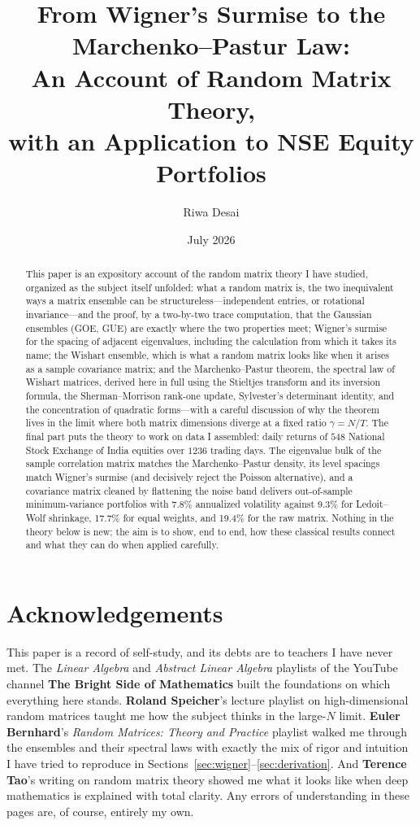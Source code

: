 \documentclass[11pt]{article}
\title{From Wigner's Surmise to the Marchenko--Pastur Law:\\
An Account of Random Matrix Theory,\\
with an Application to NSE Equity Portfolios}
\author{Riwa Desai}
\date{July 2026}
\begin{document}
\maketitle

\begin{abstract}
This paper is an expository account of the random matrix theory I have
studied, organized as the subject itself unfolded: what a random matrix is, the two inequivalent ways a matrix ensemble can
be structureless---independent entries, or rotational invariance---and the
proof, by a two-by-two trace computation, that the Gaussian ensembles (GOE,
GUE) are exactly where the two properties meet; Wigner's surmise for the
spacing of adjacent eigenvalues, including the calculation from which it
takes its name; the Wishart ensemble, which is what a random matrix looks
like when it arises as a sample covariance matrix; and the
Marchenko--Pastur theorem, the spectral law of Wishart matrices, derived
here in full using the Stieltjes transform and its
inversion formula, the Sherman--Morrison rank-one update, Sylvester's
determinant identity, and the concentration of quadratic forms---with a
careful discussion of why the theorem lives in the limit where both matrix
dimensions diverge at a fixed ratio $\gamma=N/T$. The final part puts the
theory to work on data I assembled: daily returns of $548$ National Stock
Exchange of India equities over $1236$ trading days. The eigenvalue bulk of
the sample correlation matrix matches the Marchenko--Pastur density, its
level spacings match Wigner's surmise (and decisively reject the Poisson
alternative), and a covariance matrix cleaned by flattening the noise band
delivers out-of-sample minimum-variance portfolios with 7.8\% annualized
volatility against 9.3\% for Ledoit--Wolf shrinkage, 17.7\% for equal
weights, and 19.4\% for the raw matrix. Nothing in the theory below is new;
the aim is to show, end to end, how these classical results connect and
what they can do when applied carefully.
\end{abstract}

\section*{Acknowledgements}

This paper is a record of self-study, and its debts are to teachers I
have never met. The \emph{Linear Algebra} and \emph{Abstract Linear
Algebra} playlists of the YouTube channel \textbf{The Bright Side of
Mathematics} built the foundations on which everything here stands.
\textbf{Roland Speicher}'s lecture playlist on high-dimensional random
matrices taught me how the subject thinks in the large-$N$ limit.
\textbf{Euler Bernhard}'s \emph{Random Matrices: Theory and Practice}
playlist walked me through the ensembles and their spectral laws with
exactly the mix of rigor and intuition I have tried to reproduce in
Sections~\ref{sec:wigner}--\ref{sec:derivation}. And \textbf{Terence
Tao}'s writing on random matrix theory showed me what it looks like when
deep mathematics is explained with total clarity. Any errors of
understanding in these pages are, of course, entirely my own.
\end{document}
